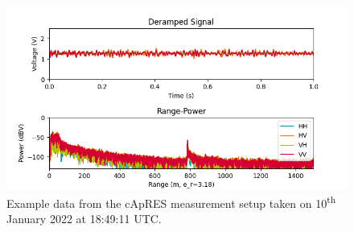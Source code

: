 \documentclass[a4paper,12pt]{article}
\begin{document}
\begin{figure}[h]
  \includegraphics[width=\textwidth]{Figures/CApRES/test_burst_2022-01-10_184911.png}
  \caption{Example data from the cApRES measurement setup taken on 10\textsuperscript{th}
  January 2022 at 18:49:11 UTC.}
\end{figure}
\clearpage
\pagebreak
\end{document}
